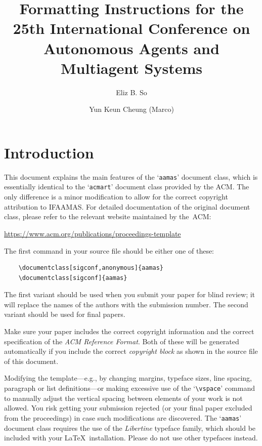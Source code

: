 \documentclass[sigconf,anonymous]{aamas}
\title[AAMAS-2026 Formatting Instructions]{Formatting Instructions for the 25th International Conference on Autonomous Agents and Multiagent Systems}
\author{Eliz B. So}
\affiliation{
  \institution{Australian National University}
  \city{Canberra}
  \country{Australia }}
\author{Yun Keun Cheung (Marco)}
\affiliation{
  \institution{Australian National University }
  \city{Canberra}
  \country{Australia}}
\begin{document}

\pagestyle{fancy}
\fancyhead{}


\maketitle 


\section{Introduction}

This document explains the main features of the `\texttt{aamas}' 
document class, which is essentially identical to the `\texttt{acmart}'
document class provided by the ACM. The only difference is a minor 
modification to allow for the correct copyright attribution to IFAAMAS.
For detailed documentation of the original document class, please refer
to the relevant website maintained by the~ACM:
%
\begin{center}
\url{https://www.acm.org/publications/proceedings-template}
\end{center}
%
The first command in your source file should be either one of these:
\begin{verbatim}
    \documentclass[sigconf,anonymous]{aamas}
    \documentclass[sigconf]{aamas}
\end{verbatim}
%
The first variant should be
used when you submit your paper for blind review; it will replace the names of the authors with the submission number.
The second variant should be used for final papers. 

Make sure your paper includes the correct copyright information and 
the correct specification of the \emph{ACM Reference Format}. Both of 
these will be generated automatically if you include the correct 
\emph{copyright block} as shown in the source file of this document.

Modifying the template---e.g., by changing margins, typeface sizes, 
line spacing, paragraph or list definitions---or making excessive use 
of the `\verb|\vspace|' command to manually adjust the vertical spacing 
between elements of your work is not allowed. You risk getting your 
submission rejected (or your final paper excluded from the proceedings) 
in case such modifications are discovered. The `\texttt{aamas}' document 
class requires the use of the \textit{Libertine} typeface family, which 
should be included with your \LaTeX\ installation. Please do not use 
other typefaces instead.
\end{document}
